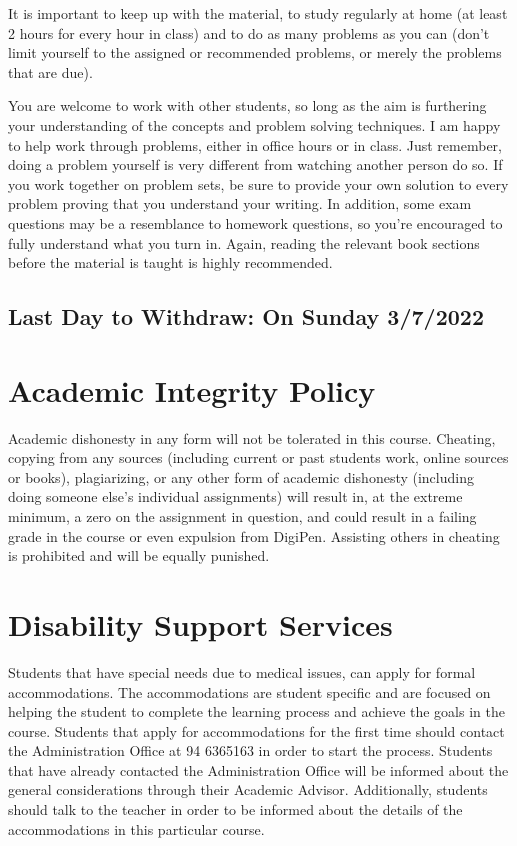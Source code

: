 \documentclass[12pt]{article}
\begin{document}
It is important to keep up with the material, to study regularly at home (at least 2 hours for every hour in class) and to do as many problems as you can 
(don’t limit yourself to the assigned or recommended problems, or merely the problems that are due).  

	You are welcome to work with other students, so long as the aim is furthering your understanding of the concepts and problem solving techniques. I am 
	happy to help work through problems, either in office hours or in class. Just remember, doing a problem yourself is very different from watching another 
	person do so. If you work together on problem sets, be sure to provide your own solution to every problem proving that you understand your writing. 
	In addition, some exam questions may be a resemblance to homework questions, so you’re encouraged to fully understand what you turn in. 
	Again, reading the relevant book sections before the material is taught is highly recommended. 


\subsection*{Last Day to Withdraw:    On Sunday 3/7/2022}

\vspace{5 mm}

\section*{Academic Integrity Policy}

Academic dishonesty in any form will not be tolerated in this course. Cheating, copying from any sources (including current or past students work, online sources 
or books), plagiarizing, or any other form of academic dishonesty (including doing someone else’s individual assignments) will result in, at the extreme minimum,
 a zero on the assignment in question, and could result in a failing grade in the course or even expulsion from DigiPen. Assisting others in cheating is prohibited 
 and will be equally punished.

\section*{Disability Support Services}

Students that have special needs due to medical issues, can apply for formal accommodations. 
The accommodations are student specific and are focused on helping the student to complete the 
learning process and achieve the goals in the course. Students that apply for accommodations for the first
 time should contact the Administration Office at 94 6365163 in order to start the process. Students that 
 have already contacted the Administration Office will be informed about the general considerations through
  their Academic Advisor. Additionally, students should talk to the teacher in order to be informed about the
   details of the accommodations in this particular course. 
\end{document}
